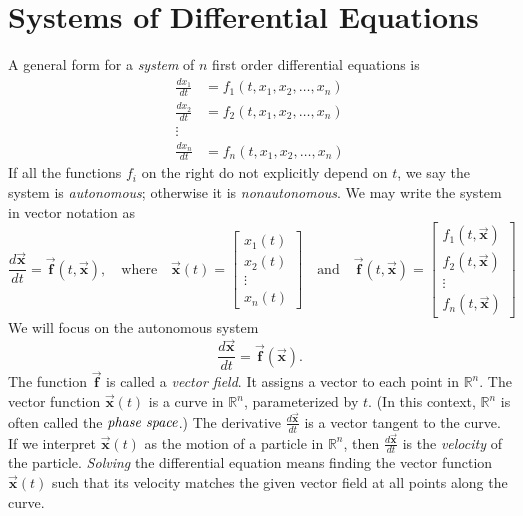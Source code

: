 \documentclass[reqno]{immbook}
\newcommand{\BF}{\vec{\textbf{f}}}
\newcommand{\BX}{\vec{\textbf{x}}}
\numberwithin{equation}{chapter}
\numberwithin{question}{section}
\numberwithin{theorem}{chapter}
\numberwithin{figure}{chapter}
\theoremstyle{definition}
\begin{document}
\newpage

\section{Systems of Differential Equations}

A general form for a \emph{system} of $n$ first order differential
equations is
\begin{equation}
\begin{split}
  \frac{dx_1}{dt} & = f_1(t,x_1,x_2,\ldots,x_n) \\
  \frac{dx_2}{dt} & = f_2(t,x_1,x_2,\ldots,x_n) \\
  \vdots \\
  \frac{dx_n}{dt} & = f_n(t,x_1,x_2,\ldots,x_n)
\end{split}
\end{equation}
If all the functions $f_i$ on the right do not explicitly depend on
$t$, we say the system is \emph{autonomous}; otherwise it is
\emph{nonautonomous}.
We may write the system in vector notation as
\begin{equation}
   \frac{d\BX}{dt} = \BF(t,\BX),
      \quad
      \textrm{where}
      \quad
      \BX(t) = \begin{bmatrix} x_1(t) \\ x_2(t) \\ \vdots \\ x_n(t)\end{bmatrix}
      \quad
      \textrm{and}
      \quad
      \BF(t,\BX) = \begin{bmatrix} f_1(t,\BX) \\ f_2(t,\BX) \\ \vdots \\ f_n(t,\BX) \end{bmatrix}
\end{equation}
We will focus on the autonomous system
\begin{equation}
   \frac{d\BX}{dt} = \BF(\BX).
\end{equation}
The function $\BF$ is called a \emph{vector field}.
It assigns a vector to each point in $\mathbb{R}^n$.
The vector function $\BX(t)$ is a curve in $\mathbb{R}^n$,
parameterized by $t$.
(In this context, $\mathbb{R}^n$ is often called
the $\emph{phase space}$.)
The derivative $\frac{d\BX}{dt}$ is a vector tangent to
the curve.
If we interpret $\BX(t)$ as the motion of a particle
in $\mathbb{R}^n$, then $\frac{d\BX}{dt}$ is the \emph{velocity}
of the particle.
\emph{Solving} the differential equation means finding
the vector function
$\BX(t)$ such that its velocity matches the given vector field
at all points along the curve.
\end{document}
